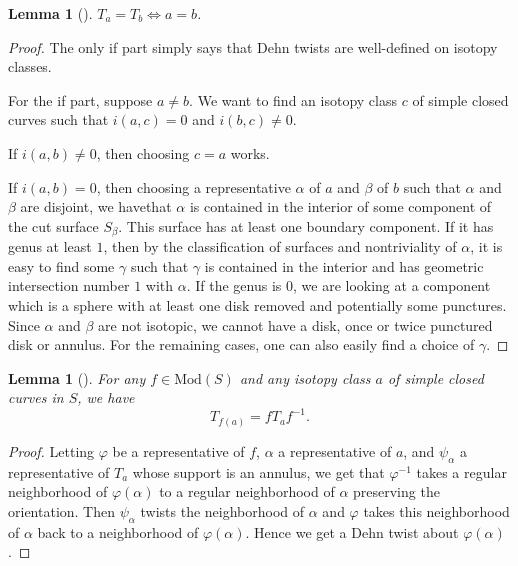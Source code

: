 \documentclass[reqno]{amsart}
\newtheorem{lemma}[theorem]{Lemma}
\theoremstyle{definition}
\theoremstyle{remark}
\newcommand{\Mod}{{\mathrm{Mod}}}
\begin{document}
\begin{lemma}[]
    $T_a = T_b \iff a = b$.
\end{lemma}

\begin{proof}
    The only if part simply says that Dehn twists are well-defined
    on isotopy classes.

    For the if part, suppose
    $a \neq b$. We want to find an isotopy class
    $c$ of simple closed curves
    such that $i(a,c) = 0$ and $i(b,c) \neq 0$.

    If $i(a,b) \neq 0$, then
    choosing $c = a$ works.

    If $i(a,b) = 0$, then
    choosing a representative $\alpha$ of $a$ and
    $\beta$ of $b$ such that $\alpha$ and $\beta$ are disjoint,
    we havethat $\alpha$ is contained in the interior of
    some component of the cut surface $S_{\beta}$.
    This surface has at least one boundary component.
    If it has genus at least $1$, then by the classification
    of surfaces and nontriviality of $\alpha$, it is
    easy to find some $\gamma$ such that
    $\gamma$ is contained in the interior and has
    geometric intersection number $1$ with $\alpha$.
    If the genus is $0$, we are looking at a component
    which is a sphere with at least one disk removed and
    potentially some punctures. Since $\alpha$ and 
    $\beta$ are not isotopic, we cannot have
    a disk, once or twice punctured disk or annulus.
    For the remaining cases, one can also easily find a
    choice of $\gamma$.
\end{proof}


\begin{lemma}[]
    For any $f \in \Mod(S)$ and any isotopy class $a$ of
    simple closed curves in $S$, we have
    \[
    T_{f(a)} = f T_a f^{-1}.
    \] 
\end{lemma}

\begin{proof}
    Letting $\varphi $ be a representative of $f$,
    $\alpha$ a representative of $a$, and
    $\psi_{\alpha}$ a representative of
    $T_a$ whose support is an annulus, we get that
    $\varphi^{-1}$ takes a regular neighborhood
    of $\varphi \left( \alpha \right) $ to a regular neighborhood
    of $\alpha$ preserving the orientation. Then
    $\psi_{\alpha}$ twists the neighborhood of $\alpha$ and
    $\varphi $ takes this neighborhood of $\alpha$ back to
    a neighborhood of $\varphi \left( \alpha \right) $.
    Hence we get a Dehn twist about $\varphi \left( \alpha \right) $.
\end{proof}
\end{document}
